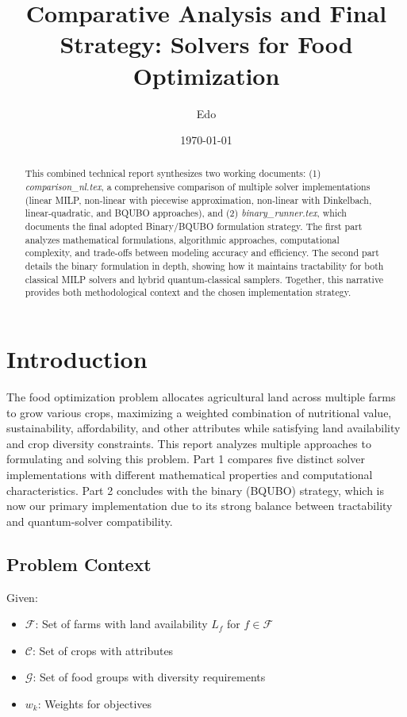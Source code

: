\documentclass[11pt,a4paper]{article}
\title{\textbf{Comparative Analysis and Final Strategy: Solvers for Food Optimization}}
\author{Edo}
\date{\today}
\begin{document}
\maketitle

\begin{abstract}
This combined technical report synthesizes two working documents: (1) \emph{comparison\_nl.tex}, a comprehensive comparison of multiple solver implementations (linear MILP, non-linear with piecewise approximation, non-linear with Dinkelbach, linear-quadratic, and BQUBO approaches), and (2) \emph{binary\_runner.tex}, which documents the final adopted Binary/BQUBO formulation strategy. The first part analyzes mathematical formulations, algorithmic approaches, computational complexity, and trade-offs between modeling accuracy and efficiency. The second part details the binary formulation in depth, showing how it maintains tractability for both classical MILP solvers and hybrid quantum-classical samplers. Together, this narrative provides both methodological context and the chosen implementation strategy.
\end{abstract}

\section{Introduction}

The food optimization problem allocates agricultural land across multiple farms to grow various crops, maximizing a weighted combination of nutritional value, sustainability, affordability, and other attributes while satisfying land availability and crop diversity constraints. This report analyzes multiple approaches to formulating and solving this problem. Part 1 compares five distinct solver implementations with different mathematical properties and computational characteristics. Part 2 concludes with the binary (BQUBO) strategy, which is now our primary implementation due to its strong balance between tractability and quantum-solver compatibility.

\subsection{Problem Context}

Given:
\begin{itemize}
    \item $\mathcal{F}$: Set of farms with land availability $L_f$ for $f \in \mathcal{F}$
    \item $\mathcal{C}$: Set of crops with attributes
    \item $\mathcal{G}$: Set of food groups with diversity requirements
    \item $w_k$: Weights for objectives
\end{itemize}
\end{document}
